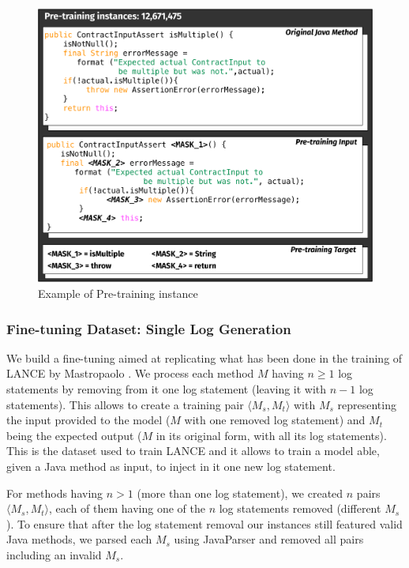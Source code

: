 \begin{figure}[h!]
	\label{fig:pre-training}
	\includegraphics[width=\columnwidth]{img/pre-training.pdf}
		\caption{Example of Pre-training instance}
\end{figure}



\subsubsection{Fine-tuning Dataset: Single Log Generation} \label{sec:single-log-dataset}
We build a fine-tuning aimed at replicating what has been done in the training of LANCE by Mastropaolo \etal \cite{mastropaolo2022using}. We process each method $M$ having $n \geq 1$ log statements by removing from it one log statement (\ie leaving it with $n-1$ log statements). This allows to create a training pair $\langle M_s, M_t \rangle$ with $M_s$ representing the input provided to the model (\ie $M$ with one removed log statement) and  $M_t$ being the expected output (\ie $M$ in its original form, with all its log statements). This is the dataset used to train LANCE \cite{mastropaolo2022using} and it allows to train a model able, given a Java method as input, to inject in it one new log statement. 

For methods having $n > 1$ (\ie more than one log statement), we created $n$ pairs $\langle M_s, M_t \rangle$, each of them having one of the $n$ log statements removed (\ie different $M_s$). To ensure that after the log statement removal our instances still featured valid Java methods, we parsed each $M_s$ using JavaParser \cite{javaparser} and removed all pairs including an invalid $M_s$. 

